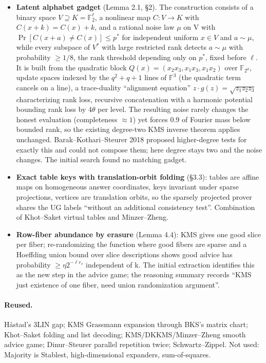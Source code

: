 \documentclass[11pt]{article}
\newcommand{\F}{\mathbb{F}}
\begin{document}
\begin{itemize}
\item \textbf{Latent alphabet gadget} (Lemma 2.1, \S{}2). The construction consists of a binary space $V\supseteq K=\F_2^\ell$, a nonlinear map $C:V\to K$ with $C(x+k)=C(x)+k$, and a rational noise law $\mu$ on V with $\Pr[C(x+a)\ne C(x)]\le p^*$ for independent uniform $x\in V$ and $a\sim\mu$, while every subspace of $V^*$ with large restricted rank detects $a\sim\mu$ with probability $\ge 1/8$, the rank threshold depending only on $p^*$, fixed before $\ell$. It is built from the quadratic block $Q(x)=(x_2x_3,x_1x_3,x_1x_2)$ over $\F_{2^d}$, update spaces indexed by the $q^2+q+1$ lines of $\F^3$ (the quadratic term cancels on a line), a trace-duality ``alignment equation'' $z\cdot g(z)=\sqrt{z_1z_2z_3}$ characterizing rank loss, recursive concatenation with a harmonic potential bounding rank loss by 4$\theta$ per level. The resulting noise rarely changes the honest evaluation (completeness $\approx 1$) yet forces 0.9 of Fourier mass below bounded rank, so the existing degree-two KMS inverse theorem applies unchanged. Barak--Kothari--Steurer 2018 proposed higher-degree tests for exactly this and could not compose them; here degree stays two and the noise changes. The initial search found no matching gadget.
\item \textbf{Exact table keys with translation-orbit folding} (\S{}3.3): tables are affine maps on homogeneous answer coordinates, keys invariant under sparse projections, vertices are translation orbits, so the sparsely projected prover shares the UG labels ``without an additional consistency test''. Combination of Khot--Saket virtual tables and Minzer--Zheng.
\item \textbf{Row-fiber abundance by erasure} (Lemma 4.4): KMS gives one good slice per fiber; re-randomizing the function where good fibers are sparse and a Hoeffding union bound over slice descriptions shows good advice has probability $\ge\eta2^{-\ell r_s}$ independent of k. The initial extraction identifies this as the new step in the advice game; the reasoning summary records ``KMS just existence of one fiber, need union randomization argument''.
\end{itemize}

\paragraph{Reused.}

Håstad's 3LIN gap; KMS Grassmann expansion through BKS's matrix chart; Khot--Saket folding and list decoding; KMS/DKKMS/Minzer--Zheng smooth advice game; Dinur--Steurer parallel repetition twice; Schwartz--Zippel. Not used: Majority is Stablest, high-dimensional expanders, sum-of-squares.
\end{document}
